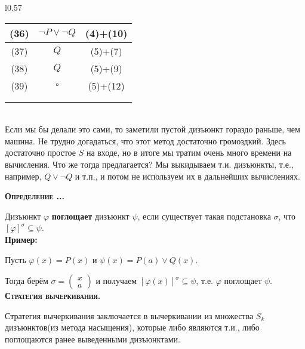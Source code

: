 \documentclass[18pt, a4paper]{extarticle}
\newcounter{par}
\newcounter{spar}
\newcounter{zap}
\newcommand{\opr}{\textbf{\textsc{Определение \thepar.\if\thespar1\thespar.\fi\thezap.\;}}\stepcounter{zap}}
\newcommand{\bftex}[1]{\textbf{\textsc{#1}.}}
\newcommand{\primer}{\textbf{Пример:\;}}
\newcommand{\vp}{\varphi}
\newcommand{\sg}{\sigma}
\begin{document}
\begin{wrapfigure}[15]{l}{0.57\textwidth}
{\begin{tabular}{ccc}
\multicolumn{1}{|c|}{\cellcolor[HTML]{34CDF9}(36)} & \multicolumn{1}{c|}{$\lnot P\vee\lnot Q$} & \multicolumn{1}{c|}{(4)+(10)} \\ \hline
\multicolumn{1}{|c|}{\cellcolor[HTML]{34CDF9}(37)} & \multicolumn{1}{c|}{$Q$}                  & \multicolumn{1}{c|}{(5)+(7)}  \\ \hline
\multicolumn{1}{|c|}{\cellcolor[HTML]{34CDF9}(38)} & \multicolumn{1}{c|}{$Q$}                  & \multicolumn{1}{c|}{(5)+(9)}  \\ \hline
\multicolumn{1}{|c|}{\cellcolor[HTML]{34CDF9}(39)} & \multicolumn{1}{c|}{$\square$}            & \multicolumn{1}{c|}{(5)+(12)} \\ \hline
\multicolumn{1}{l}{}                               & \multicolumn{1}{l}{}                      & \multicolumn{1}{l}{}          \\
\multicolumn{1}{l}{}                               & \multicolumn{1}{l}{}                      & \multicolumn{1}{l}{}         
\end{tabular}
}
\end{wrapfigure}
\;\\
Если мы бы делали это сами, то заметили пустой дизъюнкт гораздо раньше, чем машина. Не трудно догадаться, что этот метод достаточно громоздкий. Здесь достаточно простое $S$ на входе, но в итоге мы тратим очень много времени на вычисления. Что же тогда предлагается? Мы выкидываем т.и. дизъюнкты, т.е., например,\;\; $Q\vee\lnot Q$ и т.п., и потом не используем их в дальнейших вычислениях. \break
\newpage

\opr 

Дизъюнкт $\vp$ \textbf{поглощает} дизъюнкт $\psi$, если существует такая подстановка $\sg$, что $[\vp]^\sg\subseteq\psi$.\\

\primer

Пусть $\vp(x)=P(x)$ и $\psi(x)=P(a)\vee Q(x)$. 

Тогда берём $\sg=\begin{pmatrix}x\\a\end{pmatrix}$ и получаем $[\vp(x)]^\sg\subseteq\psi$, т.е. $\vp$ поглощает $\psi$.\\

\bftex{Стратегия вычеркивания}

Стратегия вычеркивания заключается в вычеркивании из множества $S_k$ дизъюнктов(из метода насыщения), которые либо являются т.и., либо поглощаются ранее выведенными дизъюнктами.
\end{document}
